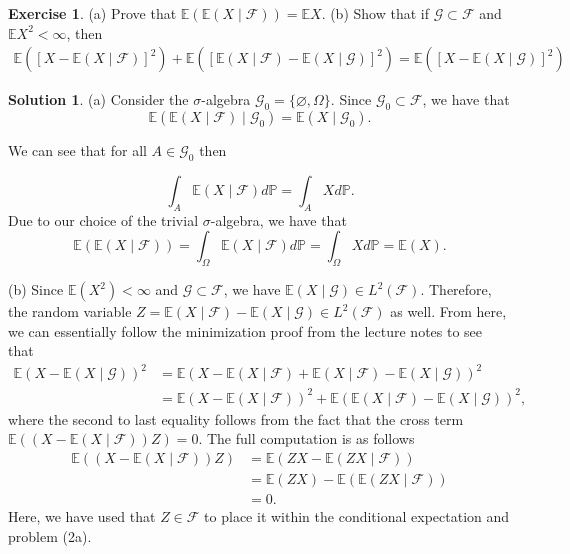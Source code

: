 \documentclass[12pt]{article}
\newcommand{\Prob}{\mathbb{P}}
\newcommand{\calF}{\mathcal{F}}
\newcommand{\Expect}{\mathbb{E}}
\theoremstyle{definition}
\newtheorem{exer}{Exercise}
\newtheorem{sol}{Solution}
\theoremstyle{remark}
\begin{document}
\newpage 

\begin{exer}
    (a) Prove that $\Expect\left( \Expect(X\mid\calF)\right) = \Expect X$.
    (b) Show that if $\mathcal{G}\subset \calF$ and $\Expect X^2 < \infty$, then
\begin{align}
    \Expect( [X - \Expect(X\mid \calF)]^2 ) + \Expect([\Expect(X\mid\calF) - \Expect(X\mid\mathcal{G})]^2) = \Expect( [X - \Expect(X\mid\mathcal{G})]^2 )
\end{align}
\end{exer}
\begin{sol}\leavevmode

    (a) Consider the $\sigma$-algebra  $\mathcal{G}_0 = \{\varnothing, \Omega \}$. Since $\mathcal{G}_0\subset \calF$, we have that
\begin{equation}
    \Expect(\Expect(X\mid \calF) \mid \mathcal{G}_0) = \Expect(X\mid \mathcal{G}_0).
\end{equation}

We can see that for all $A\in\mathcal{G}_0$ then

\begin{equation}
    \int_A \Expect(X\mid \calF) d\Prob = \int_A  X d\Prob.
\end{equation}
Due to our choice of the trivial $\sigma$-algebra, we have that 
\begin{equation}
    \Expect( \Expect(X\mid\calF) ) = \int_\Omega \Expect(X\mid \calF) d\Prob = \int_\Omega  X d\Prob = \Expect(X).
\end{equation}

(b) Since $\Expect(X^2)<\infty$ and $\mathcal{G}\subset \calF$, we have $\Expect(X\mid\mathcal{G})\in L^2(\calF)$. Therefore, the random variable $Z = \Expect(X\mid \calF) - \Expect(X\mid \mathcal{G}) \in L^2(\calF)$ as well. From here, we can essentially follow the minimization proof from the lecture notes to see that
\begin{align}
    \Expect(X -\Expect(X\mid\mathcal{G}))^2 &= \Expect(X - \Expect(X\mid\calF) + \Expect(X\mid \calF) - \Expect(X\mid\mathcal{G}))^2\\
                                                        &= \Expect(X - \Expect(X\mid \calF))^2 + \Expect( \Expect(X\mid \calF) - \Expect(X\mid \mathcal{G}) )^2, 
\end{align}
where the second to last equality follows from the fact that the cross term $\Expect( (X -\Expect(X\mid\calF)) Z ) = 0$. The full computation is as follows
\begin{align}
    \Expect( (X -\Expect(X\mid\calF)) Z ) &= \Expect(ZX - \Expect(ZX\mid \calF)) \\
                                          &= \Expect(ZX) - \Expect(\Expect(ZX \mid \calF))\\
                                          &= 0.
\end{align}
Here, we have used that $Z\in \mathcal{F}$ to place it within the conditional expectation and problem (2a). 
\end{sol}
\newpage
\end{document}
